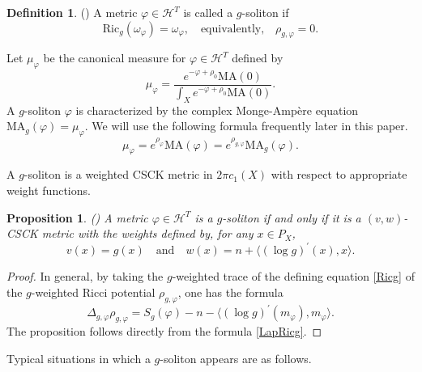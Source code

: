 \documentclass[12pt]{amsart}
\numberwithin{equation}{section}%
\theoremstyle{plain}
\newtheorem{proposition}[theorem]{Proposition}
\theoremstyle{definition}
\newtheorem{definition}[theorem]{Definition}
\newcommand{\Ric}{\mathrm{Ric}}
\newcommand{\MA}{\mathrm{MA}}
\renewcommand{\phi}{\varphi}
\newcommand{\1}{\mathbf{1}}
\begin{document}
\begin{definition}(\cite{BW14, HaLi20})
A metric $\phi\in\mathcal{H}^{T}$ is called a $g$-soliton if
\begin{equation}
\Ric_{g}(\omega_{\phi})=\omega_{\phi},
\quad\text{equivalently,}\quad
\rho_{g,\phi}=0.
\end{equation}
\end{definition}

Let $\mu_{\phi}$ be the canonical measure for $\phi\in\mathcal{H}^{T}$
defined by
\begin{equation}\label{can measure}
\mu_{\phi}=
\frac{e^{-\phi+\rho_{0}}\MA(0)}{\int_{X}e^{-\phi+\rho_{0}}\MA(0)}.
\end{equation}
A $g$-soliton $\phi$ is characterized by
the complex Monge-Amp\`ere equation
$\MA_{g}(\phi)=\mu_{\phi}$.
We will use the following formula frequently later in this paper.
\begin{equation}
\mu_{\phi}=e^{\rho_{\phi}}\MA(\phi)
=e^{\rho_{g,\phi}}\MA_{g}(\phi).
\end{equation}

A $g$-soliton is a weighted CSCK metric in $2\pi c_{1}(X)$
with respect to appropriate weight functions.

\begin{proposition}{\rm (\cite{AJL23})}
A metric $\phi\in\mathcal{H}^{T}$ is a $g$-soliton
if and only if
it is a $(v,w)$-CSCK metric with the weights defined by, for any $x\in P_{X}$,
\begin{equation}\label{w-formula}
v(x)=g(x)\quad\text{and}\quad w(x)=n+\langle(\log g)^{\prime}(x),x\rangle.
\end{equation}
\end{proposition}

\begin{proof}
In general, by taking the $g$-weighted trace of the defining equation
\eqref{Ricg} of the $g$-weighted Ricci potential $\rho_{g,\phi}$,
one has the formula
\begin{equation}\label{LapRicg}
\Delta_{g,\phi}\rho_{g,\phi}
=S_{g}(\phi)-n-\langle(\log g)^{\prime}(m_{\phi}),m_{\phi}\rangle.
\end{equation}
The proposition follows directly from the formula \eqref{LapRicg}.
\end{proof}

Typical situations in which a $g$-soliton appears are as follows.
\end{document}
